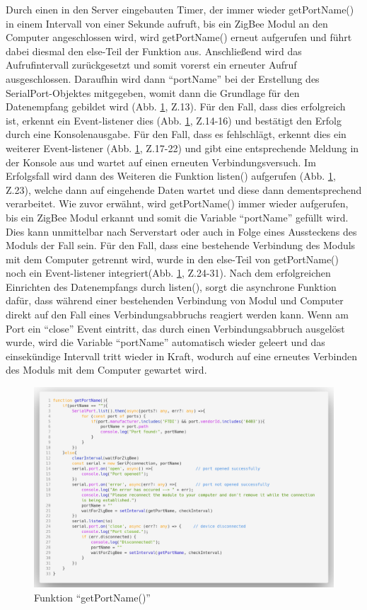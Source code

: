 \documentclass[]{article}
\begin{document}
Durch einen in den Server eingebauten Timer, der immer wieder getPortName() in einem Intervall von einer Sekunde aufruft, bis ein ZigBee Modul an den Computer angeschlossen wird, wird getPortName() erneut aufgerufen und führt dabei diesmal den else-Teil der Funktion aus. Anschließend wird das Aufrufintervall zurückgesetzt und somit vorerst ein erneuter Aufruf ausgeschlossen. Daraufhin wird dann “portName” bei der Erstellung des SerialPort-Objektes mitgegeben, womit dann die Grundlage für den Datenempfang gebildet wird (Abb. \ref{img:getPortName}, Z.13). Für den Fall, dass dies erfolgreich ist, erkennt ein Event-listener dies (Abb. \ref{img:getPortName}, Z.14-16) und bestätigt den Erfolg durch eine Konsolenausgabe. Für den Fall, dass es fehlschlägt, erkennt dies ein weiterer Event-listener (Abb. \ref{img:getPortName}, Z.17-22) und gibt eine entsprechende Meldung in der Konsole aus und wartet auf einen erneuten Verbindungsversuch. Im Erfolgsfall wird dann des Weiteren die Funktion listen() aufgerufen (Abb. \ref{img:getPortName}, Z.23), welche dann auf eingehende Daten wartet und diese dann dementsprechend verarbeitet.\newline
Wie zuvor erwähnt, wird getPortName() immer wieder aufgerufen, bis ein ZigBee Modul erkannt und somit die Variable “portName” gefüllt wird. Dies kann unmittelbar nach Serverstart oder auch in Folge eines Aussteckens des Moduls der Fall sein. Für den Fall, dass eine bestehende Verbindung des Moduls mit dem Computer getrennt wird, wurde in den else-Teil von getPortName() noch ein Event-listener integriert(Abb. \ref{img:getPortName}, Z.24-31). Nach dem erfolgreichen Einrichten des Datenempfangs durch listen(), sorgt die asynchrone Funktion dafür, dass während einer bestehenden Verbindung von Modul und Computer direkt auf den Fall eines Verbindungsabbruchs reagiert werden kann. Wenn am Port ein “close” Event eintritt, das durch einen Verbindungsabbruch ausgelöst wurde, wird die Variable “portName” automatisch wieder geleert und das einsekündige Intervall tritt wieder in Kraft, wodurch auf eine erneutes Verbinden des Moduls mit dem Computer gewartet wird.  
						\begin{figure}[!h]
							\centering
							\includegraphics[scale=0.18]{images/getPortName}
							\caption{Funktion “getPortName()”}
							\label{img:getPortName}
						\end{figure}
\end{document}
